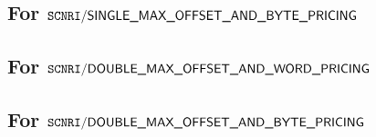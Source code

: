 \subsection{For $\texttt{SCNRI}\textsf{/}{\textsf{SINGLE\_MAX\_OFFSET\_AND\_BYTE\_PRICING}}$}       \label{mxp: computation: single_max_offset_byte}                          
\subsection{For $\texttt{SCNRI}\textsf{/}{\textsf{DOUBLE\_MAX\_OFFSET\_AND\_WORD\_PRICING}}$}       \label{mxp: computation: double_max_offset_word}              
\subsection{For $\texttt{SCNRI}\textsf{/}{\textsf{DOUBLE\_MAX\_OFFSET\_AND\_BYTE\_PRICING}}$}       \label{mxp: computation: double_max_offset_byte}              
